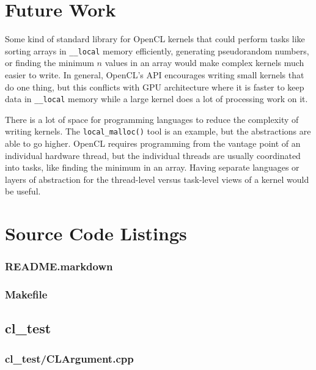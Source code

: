 \documentclass{article}
\begin{document}
\section{Future Work}
Some kind of standard library for OpenCL kernels that could perform tasks like sorting arrays in \texttt{\_\_local} memory efficiently, generating pseudorandom numbers, or finding the minimum $n$ values in an array would make complex kernels much easier to write. In general, OpenCL's API encourages writing small kernels that do one thing, but this conflicts with GPU architecture where it is faster to keep data in \texttt{\_\_local} memory while a large kernel does a lot of processing work on it.

There is a lot of space for programming languages to reduce the complexity of writing kernels. The \texttt{local\_malloc()} tool is an example, but the abstractions are able to go higher. OpenCL requires programming from the vantage point of an individual hardware thread, but the individual threads are usually coordinated into tasks, like finding the minimum in an array. Having separate languages or layers of abstraction for the thread-level versus task-level views of a kernel would be useful.




\iffalse
\appendix
\section{Source Code Listings}

\subsubsection*{README.markdown}


\subsubsection*{Makefile}


\subsection*{cl\_test}
\subsubsection*{cl\_test/CLArgument.cpp}

\end{document}
